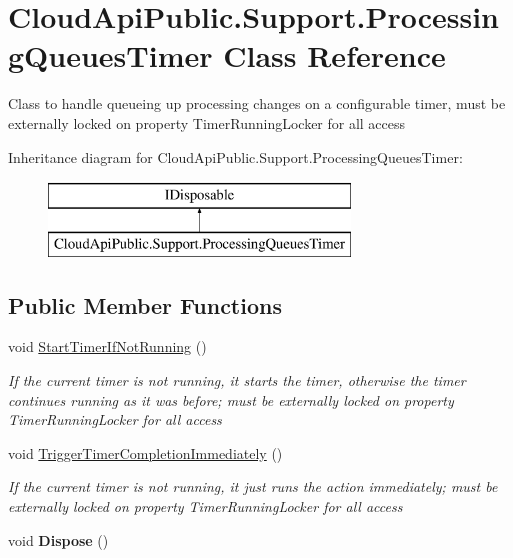 \hypertarget{class_cloud_api_public_1_1_support_1_1_processing_queues_timer}{\section{Cloud\-Api\-Public.\-Support.\-Processing\-Queues\-Timer Class Reference}
\label{class_cloud_api_public_1_1_support_1_1_processing_queues_timer}
}


Class to handle queueing up processing changes on a configurable timer, must be externally locked on property Timer\-Running\-Locker for all access  


Inheritance diagram for Cloud\-Api\-Public.\-Support.\-Processing\-Queues\-Timer\-:\begin{figure}[H]
\begin{center}
\leavevmode
\includegraphics[height=2.000000cm]{class_cloud_api_public_1_1_support_1_1_processing_queues_timer}
\end{center}
\end{figure}
\subsection*{Public Member Functions}
\begin{DoxyCompactItemize}
\item 
void \hyperlink{class_cloud_api_public_1_1_support_1_1_processing_queues_timer_ab2b799bc7901e2bfcf4cec4286b812a8}{Start\-Timer\-If\-Not\-Running} ()
\begin{DoxyCompactList}\small\item\em If the current timer is not running, it starts the timer, otherwise the timer continues running as it was before; must be externally locked on property Timer\-Running\-Locker for all access \end{DoxyCompactList}\item 
void \hyperlink{class_cloud_api_public_1_1_support_1_1_processing_queues_timer_a41a842f8098a8b2b344b3886f8f1cddd}{Trigger\-Timer\-Completion\-Immediately} ()
\begin{DoxyCompactList}\small\item\em If the current timer is not running, it just runs the action immediately; must be externally locked on property Timer\-Running\-Locker for all access \end{DoxyCompactList}\item 
\hypertarget{class_cloud_api_public_1_1_support_1_1_processing_queues_timer_aa1ca3ad0dc5b5a533fd43998146bb08c}{void {\bfseries Dispose} ()}\label{class_cloud_api_public_1_1_support_1_1_processing_queues_timer_aa1ca3ad0dc5b5a533fd43998146bb08c}

\end{DoxyCompactItemize}
